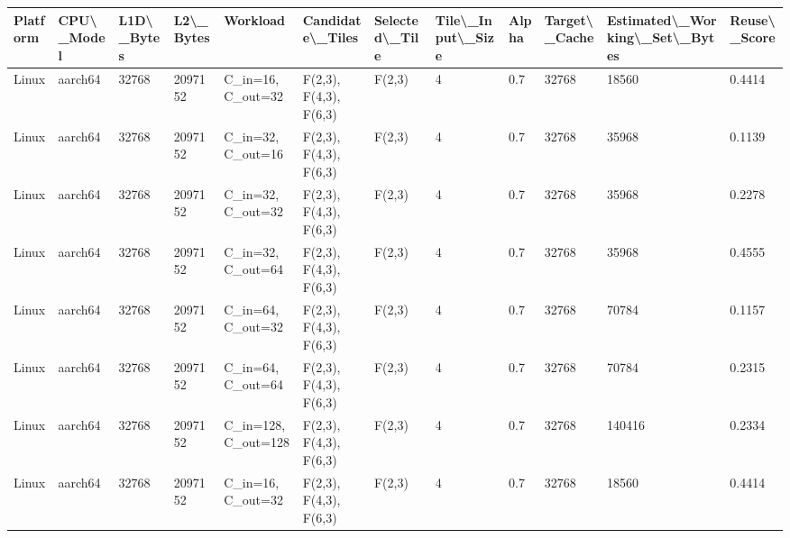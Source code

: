 \begin{table}[t]
\centering
\begin{tabular}{llllllllllll}
\toprule
Platform & CPU\textbackslash \_Model &  L1D\textbackslash \_Bytes &  L2\textbackslash \_Bytes &             Workload &        Candidate\textbackslash \_Tiles & Selected\textbackslash \_Tile &  Tile\textbackslash \_Input\textbackslash \_Size & Alpha &  Target\textbackslash \_Cache &  Estimated\textbackslash \_Working\textbackslash \_Set\textbackslash \_Bytes & Reuse\textbackslash \_Score \\
\midrule
   Linux &    aarch64 &       32768 &    2097152 &    C\_in=16, C\_out=32 &  F(2,3), F(4,3), F(6,3) &         F(2,3) &                  4 &   0.7 &          32768 &                           18560 &       0.4414 \\
   Linux &    aarch64 &       32768 &    2097152 &    C\_in=32, C\_out=16 &  F(2,3), F(4,3), F(6,3) &         F(2,3) &                  4 &   0.7 &          32768 &                           35968 &       0.1139 \\
   Linux &    aarch64 &       32768 &    2097152 &    C\_in=32, C\_out=32 &  F(2,3), F(4,3), F(6,3) &         F(2,3) &                  4 &   0.7 &          32768 &                           35968 &       0.2278 \\
   Linux &    aarch64 &       32768 &    2097152 &    C\_in=32, C\_out=64 &  F(2,3), F(4,3), F(6,3) &         F(2,3) &                  4 &   0.7 &          32768 &                           35968 &       0.4555 \\
   Linux &    aarch64 &       32768 &    2097152 &    C\_in=64, C\_out=32 &  F(2,3), F(4,3), F(6,3) &         F(2,3) &                  4 &   0.7 &          32768 &                           70784 &       0.1157 \\
   Linux &    aarch64 &       32768 &    2097152 &    C\_in=64, C\_out=64 &  F(2,3), F(4,3), F(6,3) &         F(2,3) &                  4 &   0.7 &          32768 &                           70784 &       0.2315 \\
   Linux &    aarch64 &       32768 &    2097152 &  C\_in=128, C\_out=128 &  F(2,3), F(4,3), F(6,3) &         F(2,3) &                  4 &   0.7 &          32768 &                          140416 &       0.2334 \\
   Linux &    aarch64 &       32768 &    2097152 &    C\_in=16, C\_out=32 &  F(2,3), F(4,3), F(6,3) &         F(2,3) &                  4 &   0.7 &          32768 &                           18560 &       0.4414 \\

\end{tabular}
\end{table}
